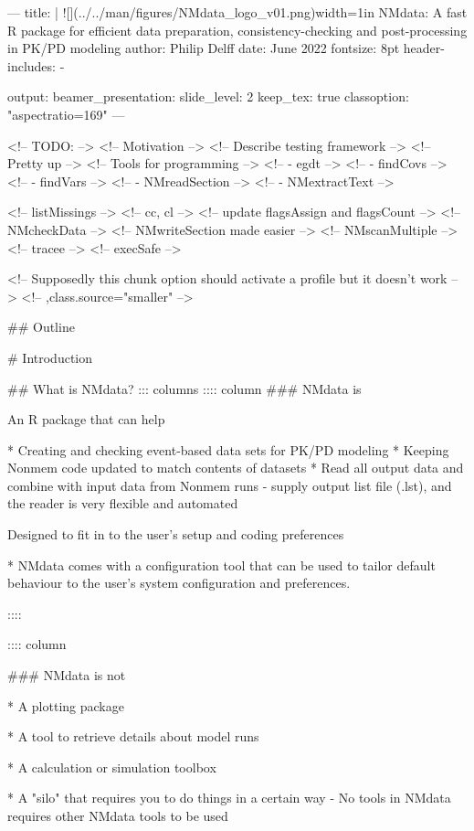 ---
title: |
 ![](../../man/figures/NMdata_logo_v01.png){width=1in}\linebreak
 NMdata: A fast R package for efficient data preparation, consistency-checking and post-processing in PK/PD modeling
author: Philip Delff
date: June 2022
fontsize: 8pt
header-includes:
 - \usepackage{adjustbox}
output: 
 beamer_presentation:
  slide_level: 2
  keep_tex: true
classoption: "aspectratio=169"
---

<!-- TODO: -->
<!-- Motivation -->
<!-- Describe testing framework -->
<!-- Pretty up -->
<!-- Tools for programming -->
<!--  - egdt -->
<!--  - findCovs -->
<!--  - findVars -->
<!--  - NMreadSection -->
<!--  - NMextractText -->

<!-- listMissings -->
<!-- cc, cl -->
<!-- update flagsAssign and flagsCount -->
<!-- NMcheckData -->
<!-- NMwriteSection made easier -->
<!-- NMscanMultiple -->
<!-- tracee -->
<!-- execSafe -->



<!-- Supposedly this chunk option should activate a profile but it doesn't work -->
<!-- ,class.source="smaller" -->


## Outline
\tableofcontents[hideallsubsections]


# Introduction

## What is NMdata?
::: columns
:::: column
### NMdata is 

An R package that can help

*  Creating and checking event-based data sets for PK/PD modeling
*  Keeping Nonmem code updated to match contents of datasets
*  Read all output data and combine with input data from Nonmem runs
- supply output list file (.lst), and the reader is very flexible and automated 

Designed to fit in to the user's setup and coding preferences

* NMdata comes with a configuration tool that can be used to tailor default behaviour to the user's system configuration and preferences.

::::

:::: column

### NMdata is not

* A plotting package

* A tool to retrieve details about model runs

* A calculation or simulation toolbox

* A "silo" that requires you to do things in a certain way
- No tools in NMdata requires other NMdata tools to be used

